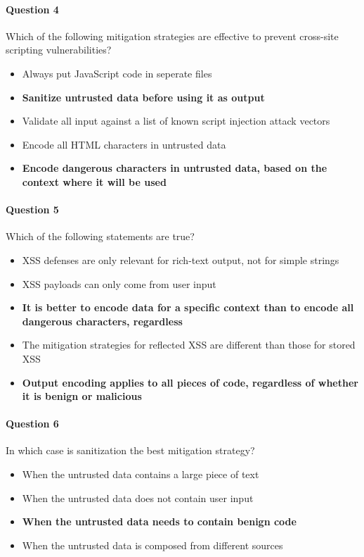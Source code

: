 \documentclass[titlepage]{article}
\begin{document}
    \paragraph{Question 4} Which of the following mitigation strategies are effective to prevent cross-site scripting vulnerabilities?
    \begin{itemize}
        \item Always put JavaScript code in seperate files
        \item \textbf{Sanitize untrusted data before using it as output} \checkmark
        \item Validate all input against a list of known script injection attack vectors
        \item Encode all HTML characters in untrusted data
        \item \textbf{Encode dangerous characters in untrusted data, based on the context where it will be used} \checkmark
    \end{itemize}
    \paragraph{Question 5} Which of the following statements are true?
    \begin{itemize}
        \item XSS defenses are only relevant for rich-text output, not for simple strings
        \item XSS payloads can only come from user input
        \item \textbf{It is better to encode data for a specific context than to encode all dangerous characters, regardless} \checkmark
        \item The mitigation strategies for reflected XSS are different than those for stored XSS
        \item \textbf{Output encoding applies to all pieces of code, regardless of whether it is benign or malicious} \checkmark
    \end{itemize}
    \paragraph{Question 6} In which case is sanitization the best mitigation strategy?
    \begin{itemize}
        \item When the untrusted data contains a large piece of text
        \item When the untrusted data does not contain user input
        \item \textbf{When the untrusted data needs to contain benign code} \checkmark
        \item When the untrusted data is composed from different sources
    \end{itemize}
\end{document}
